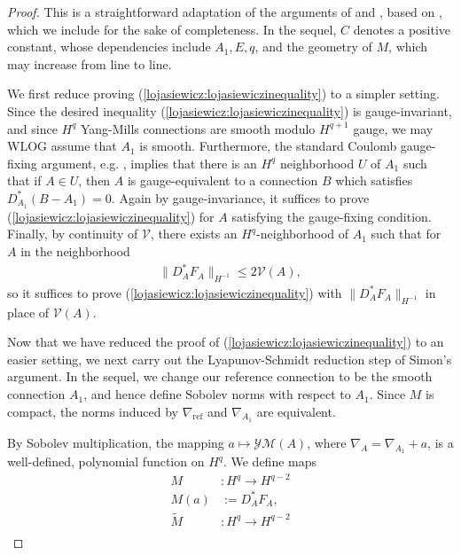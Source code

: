 \documentclass[12pt]{amsart}
\renewcommand{\1}{{\mathbf 1}}
\theoremstyle{others}
\numberwithin{equation}{section}
\begin{document}
\begin{proof}
This is a straightforward adaptation of the arguments of \cite[Prop. 7.2]{rade} and \cite[Lemma 12]{byanguniqueness}, based on \cite[Theorem 3]{leonsimon}, which we include for the sake of completeness.
In the sequel, \(C\) denotes a positive constant, whose dependencies include \(A_1, E, q\), and the geometry of \(M\), which may increase from line to line. \par
    
    We first reduce proving (\ref{lojasiewicz:lojasiewiczinequality}) to a simpler setting. Since the desired inequality (\ref{lojasiewicz:lojasiewiczinequality}) is gauge-invariant, and since \(H^q\) Yang-Mills connections are smooth modulo \(H^{q+1}\) gauge, we may WLOG assume that \(A_1\) is smooth. Furthermore, the standard Coulomb gauge-fixing argument, e.g. \cite[Prop. 2.3.4]{donkron}, implies that there is an \(H^q\) neighborhood \(U\) of \(A_1\) such that if \(A \in U\), then \(A\) is gauge-equivalent to a connection $B$  which satisfies \(D_{A_1}^\ast(B - A_1) = 0\). Again by gauge-invariance, it suffices to prove (\ref{lojasiewicz:lojasiewiczinequality}) for \(A\) satisfying the gauge-fixing condition. Finally, by continuity of \(\mathcal{V}\), there exists an \(H^q\)-neighborhood of \(A_1\) such that for \(A\) in the neighborhood
    \begin{align*}
        \|D_A^\ast F_A\|_{H^{-1}} \leq 2 \mathcal{V}(A),
    \end{align*} so it suffices to prove (\ref{lojasiewicz:lojasiewiczinequality}) with \(\|D_A^\ast F_A\|_{H^{-1}}\) in place of \(\mathcal{V}(A)\). \par
    Now that we have reduced the proof of (\ref{lojasiewicz:lojasiewiczinequality}) to an easier setting, we next carry out the Lyapunov-Schmidt reduction step of Simon's argument. In the sequel, we change our reference connection to be the smooth connection \(A_1\), and hence define Sobolev norms with respect to \(A_1\). Since \(M\) is compact, the norms induced by \(\nabla_{\text{ref}}\) and \(\nabla_{A_1}\) are equivalent. \par 
    By Sobolev multiplication, the mapping \(a \mapsto \mathcal{YM}(A)\), where \(\nabla_A = \nabla_{A_1} + a\), is a well-defined, polynomial function on \(H^q\). 
    We define maps
    \begin{align*}
        M &: H^q \to H^{q-2} \\
        M(a) &:= D_A^\ast F_A, \\
        \tilde{M} &: H^q \to H^{q-2} \\

\end{align*}
\end{proof}
\end{document}
